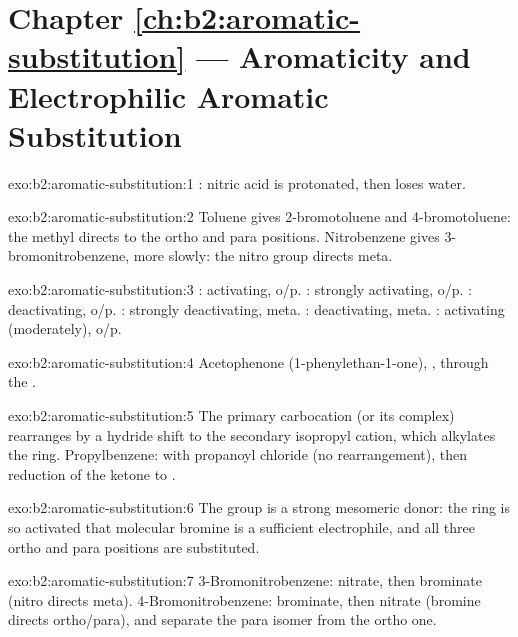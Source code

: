 \section*{Chapter \ref{ch:b2:aromatic-substitution} --- Aromaticity and Electrophilic Aromatic Substitution}

\begin{solution}{exo:b2:aromatic-substitution:1}
: nitric acid is protonated, then loses water.
\end{solution}

\begin{solution}{exo:b2:aromatic-substitution:2}
Toluene gives 2-bromotoluene and 4-bromotoluene: the methyl directs to the ortho and
para positions. Nitrobenzene gives 3-bromonitrobenzene, more slowly: the nitro group
directs meta.
\end{solution}

\begin{solution}{exo:b2:aromatic-substitution:3}
: activating, o/p. : strongly activating, o/p. : deactivating, o/p.
: strongly deactivating, meta. : deactivating, meta. :
activating (moderately), o/p.
\end{solution}

\begin{solution}{exo:b2:aromatic-substitution:4}
Acetophenone (1-phenylethan-1-one), , through the  .
\end{solution}

\begin{solution}{exo:b2:aromatic-substitution:5}
The primary carbocation (or its complex) rearranges by a hydride shift to the secondary
isopropyl cation, which alkylates the ring. Propylbenzene:  with
propanoyl chloride (no rearrangement), then reduction of the ketone  to .
\end{solution}

\begin{solution}{exo:b2:aromatic-substitution:6}
The  group is a strong mesomeric donor: the ring is so activated that molecular bromine
is a sufficient electrophile, and all three ortho and para positions are substituted.
\end{solution}

\begin{solution}{exo:b2:aromatic-substitution:7}
3-Bromonitrobenzene: nitrate, then brominate (nitro directs meta). 4-Bromonitrobenzene:
brominate, then nitrate (bromine directs ortho/para), and separate the para isomer from the
ortho one.
\end{solution}

